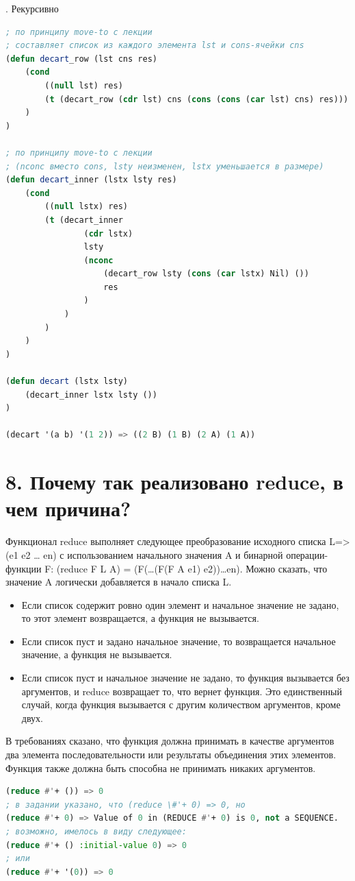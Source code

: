\documentclass[12pt]{report}
\begin{document}
. Рекурсивно
\begin{lstlisting}[language=Lisp]
; по принципу move-to с лекции
; составляет список из каждого элемента lst и cons-ячейки cns
(defun decart_row (lst cns res) 
	(cond
		((null lst) res)
		(t (decart_row (cdr lst) cns (cons (cons (car lst) cns) res)))
	)
)

; по принципу move-to с лекции 
; (nconc вместо cons, lsty неизменен, lstx уменьшается в размере)
(defun decart_inner (lstx lsty res) 
	(cond
		((null lstx) res)
		(t (decart_inner 
				(cdr lstx) 
				lsty 
				(nconc 
					(decart_row lsty (cons (car lstx) Nil) ())
					res
				)
			)
		)
	)
)	

(defun decart (lstx lsty) 
	(decart_inner lstx lsty ())
)

(decart '(a b) '(1 2)) => ((2 B) (1 B) (2 A) (1 A))	
\end{lstlisting}

\clearpage
\section*{8. Почему так реализовано reduce, в чем причина?}

Функционал reduce выполняет следующее преобразование исходного списка L=>(e1 e2 … en) с использованием начального значения A и бинарной операции-функции F: (reduce F L A) = (F(…(F(F A e1) e2))…en). Можно сказать, что значение A логически добавляется в начало списка L.

\begin{itemize}
	\item Если список содержит ровно один элемент и начальное значение не задано, то этот элемент возвращается, а функция не вызывается. 
	\item Если список пуст и задано начальное значение, то возвращается начальное значение, а функция не вызывается. 
	\item Если список пуст и начальное значение не задано, то функция вызывается без аргументов, и reduce возвращает то, что вернет функция. Это единственный случай, когда функция вызывается с другим количеством аргументов, кроме двух.
\end{itemize}

В требованиях сказано, что функция должна принимать в качестве аргументов два элемента последовательности или результаты объединения этих элементов. Функция также должна быть способна не принимать никаких аргументов.

\begin{lstlisting}[language=Lisp]
(reduce #'+ ()) => 0
; в задании указано, что (reduce \#'+ 0) => 0, но
(reduce #'+ 0) => Value of 0 in (REDUCE #'+ 0) is 0, not a SEQUENCE.
; возможно, имелось в виду следующее:
(reduce #'+ () :initial-value 0) => 0
; или
(reduce #'+ '(0)) => 0
\end{lstlisting}
\end{document}
